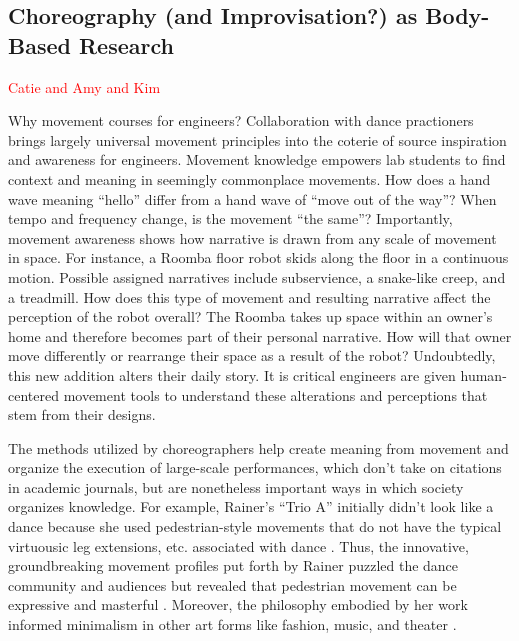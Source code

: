 \documentclass[arts,article,submit,moreauthors,pdftex,10pt,a4paper]{mdpi}
\begin{document}
\subsection{Choreography (and Improvisation?) as Body-Based Research}

\textcolor{red}{Catie and Amy and Kim}

Why movement courses for engineers?  %
Collaboration with dance practioners brings largely universal movement principles into the coterie of source inspiration and awareness for engineers.  Movement knowledge empowers lab students to find context and meaning in seemingly commonplace movements.  How does a hand wave meaning ``hello'' differ from a hand wave of ``move out of the way''?  When tempo and frequency change, is the movement ``the same''?  Importantly, movement awareness shows how narrative is drawn from any scale of movement in space.  For instance, a Roomba \cite{roomba} floor robot skids along the floor in a continuous motion.  Possible assigned narratives include subservience, a snake-like creep, and a treadmill.  How does this type of movement and resulting narrative affect the perception of the robot overall?  The Roomba takes up space within an owner’s home and therefore becomes part of their personal narrative.  How will that owner move differently or rearrange their space as a result of the robot?  Undoubtedly, this new addition alters their daily story.  It is critical engineers are given human-centered movement tools to understand these alterations and perceptions that stem from their designs.

The methods utilized by choreographers help create meaning from movement and organize the execution of large-scale performances, which don't take on citations in academic journals, but are nonetheless important ways in which society organizes knowledge.  For example, Rainer's ``Trio A'' initially didn't look like a dance because she used pedestrian-style movements that do not have the typical virtuousic leg extensions, etc. associated with dance \cite{rainer1966quasi,lambert2008being}.  Thus, the innovative, groundbreaking movement profiles put forth by Rainer puzzled the dance community and audiences but revealed that pedestrian movement can be expressive and masterful \cite{exempli}.  Moreover, the philosophy embodied by her work \cite{rainer2006no} informed minimalism in other art forms like fashion, music, and theater \cite{copeland1993dance,lambert1999moving}.  
\end{document}
